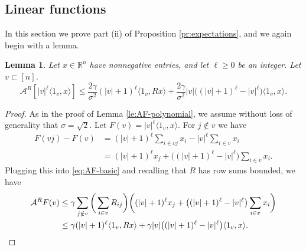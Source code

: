 \documentclass[11pt,reqno]{amsart}
\numberwithin{equation}{section}
\newtheorem{lemma}[theorem]{Lemma}
\theoremstyle{definition}
\def\A{{\mathcal A}}
\def\R{{\mathbb R}}
\begin{document}
\subsection{Linear functions}

In this section we prove part (ii) of Proposition \ref{pr:expectations}, and we again begin with a lemma.

\begin{lemma} \label{le:AF-linear}
Let $x \in \R^n$ have nonnegative entries, and let $\ell \ge 0$ be an integer. Let $v \subset [n]$. 
\begin{equation}
\A^{R}[|v|^\ell \langle 1_v,x\rangle ] 
 \le \frac{2\gamma}{\sigma^2}(|v|+1)^\ell \langle 1_v, R x\rangle + \frac{2\gamma}{\sigma^2} |v| \big((|v|+1)^{\ell} - |v|^\ell\big)\langle 1_v, x\rangle . \label{pf:linear1}
\end{equation}
\end{lemma}
\begin{proof}
As in the proof of Lemma \ref{le:AF-polynomial}, we assume without loss of generality that $\sigma = \sqrt{2 }$. Let $F(v) = |v|^\ell \langle 1_v,x\rangle$. For $j\notin v$ we have
		\begin{align*}
			F(vj) - F(v) &= (|v|+1)^\ell\sum_{i\in vj}x_i - |v|^\ell\sum_{i\in v}x_i \\
				&= (|v|+1)^\ell x_j +  \big((|v|+1)^{\ell} - |v|^\ell\big)\sum_{i\in v}x_i.
		\end{align*}
		Plugging this into \eqref{eq:AF-basic} and recalling that $R$ has row sums bounded, we have
		\begin{align*}
			\A^{R} F(v) 	&\le \gamma\sum_{j \notin v}\bigg( \sum_{i \in v}R_{ij}\bigg) \bigg((|v|+1)^\ell x_j + \big((|v|+1)^{\ell} - |v|^\ell\big)\sum_{i\in v}x_i \bigg)\\
			&\le \gamma(|v|+1)^\ell \langle 1_v, R x\rangle + \gamma |v| \big((|v|+1)^{\ell} - |v|^\ell\big)\langle 1_v, x\rangle. \qedhere
		\end{align*}
\end{proof}
\end{document}
